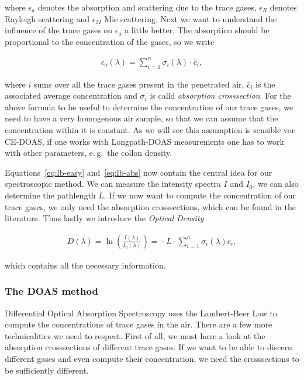 where $\epsilon_a$ denotes the absorption and scattering due to the
trace gases, $\epsilon_R$ denotes Rayleigh scattering and $\epsilon_M$
Mie scattering. Next we want to understand the influence of the trace
gases on $\epsilon_a$ a little better. The absorption should be
proportional to the concentration of the gases, so we write

\begin{align}
  \epsilon_a(\lambda) = \sum_{i=1}^n \sigma_i(\lambda) \cdot \bar c_i, \label{eq:lb-abs}
\end{align}

where $i$ sums over all the trace gases present in the penetrated
air, $\bar c_i$ is the associated average concentration and $\sigma_i$
is calld \emph{absorption crosssection}. For the above formula to be
useful to determine the concentration of our trace gases, we need to
have a very homogenous air sample, so that we can assume that the
concentration within it is constant. As we will see this assumption is
sensible vor CE-DOAS, if one works with Longpath-DOAS measurements one
has to work with other parameters, e.\,g.\ the collon density.

Equations~\eqref{eq:lb-easy} and~\eqref{eq:lb-abs} now contain the central idea for our
spectroscopic method. We can measure the intensity spectra $I$ and
$I_0$, we can also determine the pathlength $L$. If we now want to
compute the concentration of our trace gases, we only need the
absorption crosssections, which can be found in the
literature. Thus lastly we introduce the \emph{Optical
  Density} 

\begin{align*}
  D(\lambda) = \ln \left(\frac{I(\lambda)}{I_0(\lambda)}\right) = - L
  \cdot \sum_{i=1}^n \sigma_i(\lambda) c_i,
\end{align*}

which contains all the necessary information.

\subsubsection{The DOAS method}
\label{sec:doas}


Differential Optical Absorption Spectroscopy uses the Lambert-Beer Law
to compute the concentrations of trace gases in the air. There are a
few more technicalities we need to respect. First of all, we must have
a look at the absorption crosssections of different trace gases. If we
want to be able to discern different gases and even compute their
concentration, we need the crosssections to be sufficiently
different.

